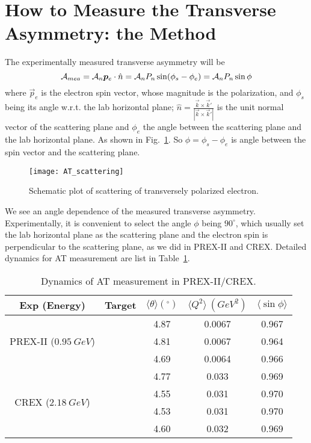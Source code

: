 \section{How to Measure the Transverse Asymmetry: the Method}
The experimentally measured transverse asymmetry will be
\begin{equation}
    \mathcal{A}_{mea} = \mathcal{A}_n \boldsymbol{p}_e \cdot \hat{n} = \mathcal{A}_n P_n \sin(\phi_s - \phi_e) = \mathcal{A}_n P_n \sin\phi
    \label{eq:measured_AT}
\end{equation}
where $\vec{p}_e$ is the electron spin vector, whose magnitude is the polarization,
and $\phi_s$ being its angle w.r.t. the lab horizontal plane; 
$\hat{n} = \frac{\vec{k} \times \vec{k}'}{|\vec{k} \times \vec{k}'|}$ 
is the unit normal vector of the scattering plane and $\phi_e$ the angle between
the scattering plane and the lab horizontal plane. As shown in Fig.~\ref{fig:AT_scattering}.
So $\phi = \phi_s - \phi_e$ is angle between the spin vector and the scattering plane.
\begin{figure}[h!]
    \centering
    \texttt{[image: AT\_scattering]}
    \caption{Schematic plot of scattering of transversely polarized electron.}
    \label{fig:AT_scattering}
\end{figure}

We see an angle dependence of the measured transverse asymmetry. Experimentally,
it is convenient to select the angle $\phi$ being $90^\circ$, which
usually set the lab horizontal plane as the scattering plane and the electron spin
is perpendicular to the scattering plane, as we did in PREX-II and CREX. Detailed
dynamics for AT measurement are list in Table~\ref{tab:AT_dynamics}.

\begin{table}
    \centering
    \begin{tabular}{c c | c c c}
	\hline
	Exp (Energy)	& Target    & $\langle \theta \rangle ({}^\circ)$   & $\langle Q^2 \rangle \ (GeV^2)$	& $\langle \sin\phi \rangle$	\\
	\hline
	\multirow{3}{*}{PREX-II ($0.95\ GeV$)}
	    & \C    & 4.87  & 0.0067    & 0.967 \\ 
	    & \ca   & 4.81  & 0.0067    & 0.964 \\ 
	    & \Pb   & 4.69  & 0.0064    & 0.966 \\ 
	\hline
	\multirow{4}{*}{CREX ($2.18\ GeV$)}
	    & \C    & 4.77  & 0.033	& 0.969 \\ 
	    & \ca   & 4.55  & 0.031	& 0.970 \\ 
	    & \Ca   & 4.53  & 0.031     & 0.970 \\ 
	    & \Pb   & 4.60  & 0.032     & 0.969 \\ 
	\hline
    \end{tabular}
    \caption{Dynamics of AT measurement in PREX-II/CREX.}
    \label{tab:AT_dynamics}
\end{table}

